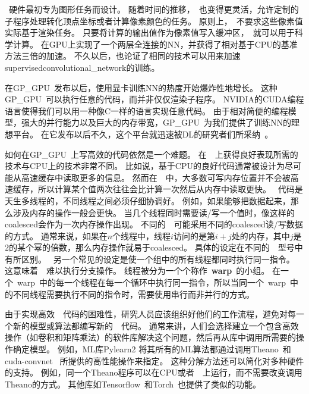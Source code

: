 ~硬件最初专为图形任务而设计。
随着时间的推移，~也变得更灵活，允许定制的子程序处理转化顶点坐标或者计算像素颜色的任务。
原则上，~不要求这些像素值实际基于渲染任务。
只要将计算的输出值作为像素值写入缓冲区，~就可以用于科学计算。
\citet{Steinkrau2005}在GPU上实现了一个两层全连接的\gls{NN}，并获得了相对基于CPU的基准方法三倍的加速。
不久以后，\citet{chellapilla:inria-00112631}也论证了相同的技术可以用来加速\gls{supervised}\gls{convolutional_network}的训练。


在\gls{GP_GPU}~发布以后，使用显卡训练\gls{NN}的热度开始爆炸性地增长。
这种\gls{GP_GPU}~可以执行任意的代码，而并非仅仅渲染子程序。
NVIDIA的CUDA编程语言使得我们可以用一种像C一样的语言实现任意代码。
由于相对简便的编程模型，强大的并行能力以及巨大的内存带宽，\gls{GP_GPU}~为我们提供了训练\gls{NN}的理想平台。
在它发布以后不久，这个平台就迅速被\gls{DL}的研究者们所采纳~\citep{RainaICML09-small,Ciresan-2010}。



如何在\gls{GP_GPU}~上写高效的代码依然是一个难题。
在~~上获得良好表现所需的技术与CPU上的技术非常不同。
比如说，基于CPU的良好代码通常被设计为尽可能从高速缓存中读取更多的信息。
然而在~~中，大多数可写内存位置并不会被高速缓存，所以计算某个值两次往往会比计算一次然后从内存中读取更快。
~代码是天生多线程的，不同线程之间必须仔细协调好。
例如，如果能够把数据起来，那么涉及内存的操作一般会更快。
当几个线程同时需要读/写一个值时，像这样的\gls{coalesced}会作为一次内存操作出现。
不同的~~可能采用不同的\gls{coalesced}读/写数据的方式。
通常来说，如果在$n$个线程中，线程$i$访问的是第$i+j$处的内存，其中$j$是$2$的某个幂的倍数，那么内存操作就易于\gls{coalesced}。
具体的设定在不同的~~型号中有所区别。
~另一个常见的设定是使一个组中的所有线程都同时执行同一指令。
这意味着~~难以执行分支操作。
线程被分为一个个称作~\textbf{warp}~的小组。
在一个~\gls{warp}~中的每一个线程在每一个循环中执行同一指令，所以当同一个~\gls{warp}~中的不同线程需要执行不同的指令时，需要使用串行而非并行的方式。


由于实现高效~~代码的困难性，研究人员应该组织好他们的工作流程，避免对每一个新的模型或算法都编写新的~~代码。
通常来讲，人们会选择建立一个包含高效操作（如卷积和矩阵乘法）的软件库解决这个问题，然后再从库中调用所需要的操作确定模型。
例如，\gls{ML}库Pylearn2 \citep{pylearn2_arxiv_2013}将其所有的\gls{ML}算法都通过调用Theano~\citep{bergstra+al:2010-scipy-short,Bastien-2012}和cuda-convnet~\citep{Krizhevsky2010tr} 所提供的高性能操作来指定。
这种分解方法还可以简化对多种硬件的支持。
例如，同一个Theano程序可以在CPU或者~~上运行，而不需要改变调用Theano的方式。
其他库如Tensorflow~\citep{tensorflow}和Torch~\citep{Torch-2011}也提供了类似的功能。


